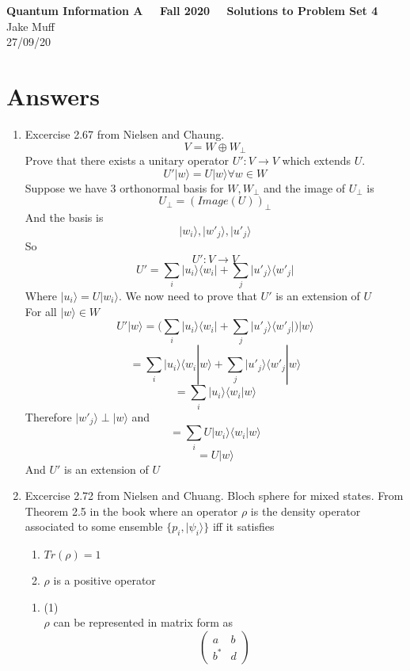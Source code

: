 \documentclass[12pt]{article}
\newcommand{\ket}[1]{\vert{#1}\rangle}
\newcommand{\bra}[1]{\langle{#1}\vert}
\begin{document}
\normalsize

\baselineskip 14pt

\begin{center}
{\Large {\bf Quantum Information A \ \ Fall 2020 \ \  Solutions to Problem Set 4}} \\
Jake Muff \\
27/09/20
\end{center}

\bigskip
\section{Answers}
\begin{enumerate}

\item Excercise 2.67 from Nielsen and Chaung.
$$V=W\oplus W_\perp$$
Prove that there exists a unitary operator $U': V \rightarrow V$ which extends $U$. 
$$ U' \ket{w} = U \ket{w} \forall w \in W$$
Suppose we have 3 orthonormal basis for $W, W_\perp$ and the image of $U_\perp$ is 
$$ U_\perp = (Image(U))_\perp $$
And the basis is 
$$ \ket{w_i}, \ket{w'_j}, \ket{u'_j}$$ 
So 
$$ U': V \rightarrow V $$ 
$$ U' = \sum_i \ket{u_i}\bra{w_i} + \sum_j \ket{u'_j} \bra{w'_j} $$
Where $\ket{u_i} = U \ket{w_i}$. We now need to prove that $U'$ is an extension of $U$ \\
For all $\ket{w} \in W$ 
$$ U' \ket{w} = \Big( \sum_i \ket{u_i} \bra{w_i} + \sum_j \ket{u'_j}\bra{w'_j}\Big)\ket{w} $$ 
$$ = \sum_i \ket{u_i} \langle w_i | w \rangle + \sum_j \ket{u'_j} \langle w'_j | w \rangle $$ 
$$ = \sum_i \ket{u_i} \langle w_i | w \rangle $$
Therefore $\ket{w'_j} \perp \ket{w}$ and 
$$ = \sum_i U \ket{w_i} \langle w_i | w \rangle $$
$$ = U \ket{w} $$
And $U'$ is an extension of $U$ 
\item Excercise 2.72 from Nielsen and Chuang. Bloch sphere for mixed states. From Theorem 2.5 in the book where an operator $\rho$ is the density operator associated to some ensemble $\{p_i, \ket{\psi_i}\}$ iff it satisfies
\begin{enumerate}
    \item $Tr(\rho) = 1$
    \item $\rho$ is a positive operator 
\end{enumerate}
\begin{enumerate}
\item (1) \\
$\rho$ can be represented in matrix form as 
$$ \left(\begin{array}{cc} a & b \\ b^* & d\end{array}\right)$$

\end{enumerate}
\end{enumerate}
\end{document}
